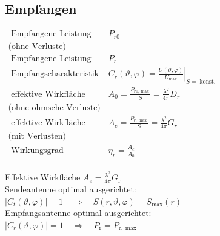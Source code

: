 \documentclass[english]{latex4ei/latex4ei_sheet}
\begin{document}
\begin{sectionbox}
    \subsection{Empfangen}
    $\begin{array}{ll}
            \text { Empfangene Leistung }    & P_{r 0}                                                                                             \\
            \text{(ohne Verluste)}           &                                                                                                     \\
            \text { Empfangene Leistung }    & P_{r}                                                                                               \\
            \text { Empfangscharakteristik } & C_{r}(\vartheta, \varphi)=\left.\frac{U(\vartheta, \varphi)}{U_{\max }}\right|_{S=\text { konst. }} \\
            \text { effektive Wirkfläche }   & A_{0}=\frac{P_{r 0, \max }}{S}=\frac{\lambda^{2}}{4 \pi} D_{r}                                      \\
            \text{(ohne ohmsche Verluste)}   &                                                                                                     \\
            \text { effektive Wirkfläche }   & A_{e}=\frac{P_{r, \max }}{S}=\frac{\lambda^{2}}{4 \pi} G_{r}                                        \\
            \text{(mit Verlusten)}           &                                                                                                     \\
            \text { Wirkungsgrad}            & \eta_{r}=\frac{A_{e}}{A_{0}}                                                                        \\
        \end{array}$

\end{sectionbox}
\begin{sectionbox}

    \begin{emphbox}
        \begin{flushleft}
            Effektive Wirkfläche 	$A_{e}=\frac{\lambda^{2}}{4 \pi}G_{\mathrm{r}}$\\
            Sendeantenne optimal ausgerichtet:\\
            $\left|C_{t}(\vartheta, \varphi)\right|=1 \quad \Rightarrow \quad S(r, \vartheta, \varphi)=S_{\max }(r)$\\
            Empfangsantenne optimal ausgerichtet:\\
            $\left|C_{r}(\vartheta, \varphi)\right|=1 \quad \Rightarrow \quad P_{\mathrm{r}}=P_{\mathrm{r}, \max }$
        \end{flushleft}
    \end{emphbox}
\end{sectionbox}
\end{document}
